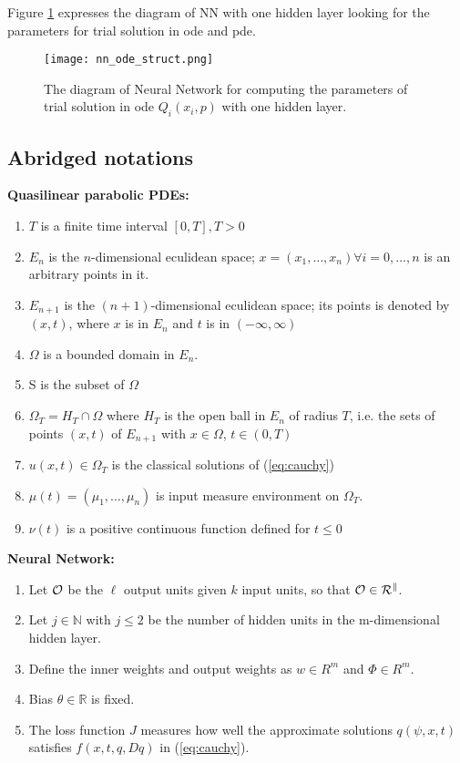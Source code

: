 \documentclass{article}
\begin{document}
Figure \ref{fig:nn_ode_struct} expresses the diagram of NN with one hidden layer looking for the parameters for trial solution in ode and pde. 
\begin{figure}[h]
	\centering
	\texttt{[image: nn\_ode\_struct.png]}
	\caption{The diagram of Neural Network for computing the parameters of trial solution in ode $Q_{i}(x_i,p)$ with one hidden layer. }
	\label{fig:nn_ode_struct}
\end{figure}
	\subsection{Abridged notations}
	\textbf{Quasilinear parabolic PDEs:}
	\begin{enumerate}
			\item $T$ is a finite time interval $[0,T], T>0$
		\item $E_{n}$ is the $n$-dimensional eculidean space; $x = (x_1, \dots , x_n) \forall i = 0, \dots, n$ is an arbitrary points in it.
		\item $E_{n+1}$ is the $(n+1)$-dimensional eculidean space;
		its points is denoted by $(x,t)$, where $x$ is in $E_{n}$ and $t$ is in $(- \infty, \infty)$
		\item $\Omega$ is a bounded domain in $E_{n}$.
		\item S is the subset of $\Omega$
		\item $\Omega_{T} = H_{T} \cap \Omega$ where $H_{T}$ is the open ball in $E_{n}$ of radius $T$, i.e. the sets of points $(x,t)$ of $E_{n+1}$ with $x \in \Omega$, $t \in (0,T)$
		\item $u(x,t) \in \Omega_{T}$ is the classical solutions of (\ref{eq:cauchy})
		\item $\mu(t)=(\mu_1, \dots, \mu_{n})$ is input measure environment on $\Omega_{T}$.
		\item $\nu(t)$ is a positive continuous function defined for $t \leq 0$
	\end{enumerate}
	\textbf{Neural Network:}
	\begin{enumerate}
		\item Let $\cal{O}$ be the $\ell$ output units given $k$ input units, so that $\cal{O} \in R^{k}$.
		\item Let $j \in \mathbb{N}$ with $j \leq 2$ be the number of hidden units in the m-dimensional hidden layer.
		\item Define the inner weights and output weights as $w \in R^m$ and $\Phi \in R^m$.
		\item Bias $\theta \in \mathbb{R}$ is fixed.
		\item The loss function $J$ measures how well the approximate solutions $q(\psi,x,t)$ satisfies $f(x,t,q,Dq)$ in (\ref{eq:cauchy}).
\end{enumerate}
\end{document}
